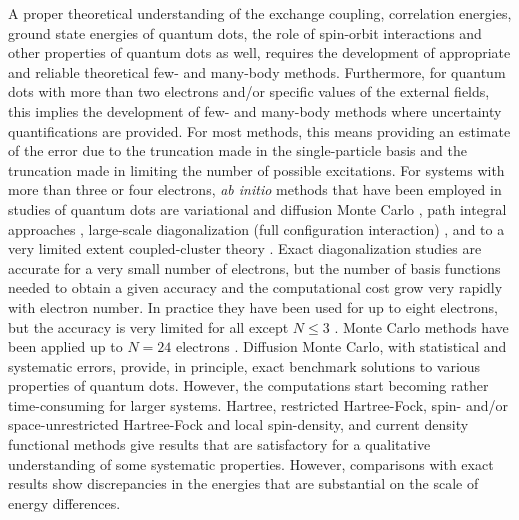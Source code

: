 \documentclass[10pt]{revtex4}
\begin{document}
A proper theoretical understanding of the exchange coupling, correlation energies, 
ground state energies of quantum dots, the role of spin-orbit interactions
and other properties of quantum dots as well, requires the development of appropriate and reliable  
theoretical  few- and many-body methods. 
Furthermore, for quantum dots with more than two electrons and/or specific values of the 
external fields, this implies the development of few- and many-body methods where   
uncertainty
quantifications are provided.  
For most methods, this means providing an estimate of the error due 
to the truncation made in the single-particle basis and the truncation made in 
limiting the number of possible excitations.
For systems with more than three or four electrons,  {\em ab initio} methods that have 
been employed in studies of quantum dots are
 variational and diffusion Monte Carlo \cite{harju2005,pederiva2001, pederiva2003}, path integral approaches \cite{pi1999}, 
large-scale diagonalization (full configuration 
interaction) \cite{Eto97,Maksym90,simen2008,modena2000}, and to a very limited extent 
coupled-cluster theory \cite{shavittbartlett2009,bartlett2007,bartlett2003,indians,us2011}. 
Exact diagonalization studies are accurate for a very small number
of electrons, but the number of basis functions needed to obtain a given
accuracy and the computational cost grow very rapidly with electron number.
In practice they have been used for up to eight electrons\cite{Eto97,Maksym90,modena2000}, but the accuracy is
very limited for all except $N\le 3$ .  
Monte Carlo methods have been applied up to $N=24$ electrons 
\cite{pederiva2001,pederiva2003}. Diffusion Monte Carlo, with statistical and systematic errors, provide, in principle,
exact benchmark solutions to various properties of quantum dots. However, 
the computations start becoming rather time-consuming for larger systems.   
Hartree\cite{Kum90}, restricted Hartree-Fock, spin- and/or space-unrestricted
Hartree-Fock\cite{Fuj96,Mul96,Yan99} and
local spin-density, and current density functional methods\cite{Kos97,Hir99,finns1,finns2}
give results that are satisfactory for a qualitative understanding of some
systematic properties. However, comparisons with exact results show
discrepancies in the energies that are substantial
on the scale of energy differences. 
\end{document}
